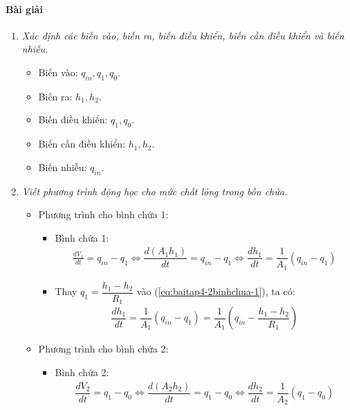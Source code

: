 \paragraph{Bài giải}
    \begin{enumerate}[\it a.]
        \item \textit{Xác định các biến vào, biến ra, biến điều khiển, biến cần điều khiển và biến nhiễu.}
            \begin{itemize}
                \item Biến vào: $q_{in}, q_1, q_0$.
                \item Biến ra: $h_1, h_2$.
                \item Biến điều khiển: $q_1, q_0$.
                \item Biến cần điều khiển: $h_1, h_2$.
                \item Biến nhiễu: $q_{in}$.
            \end{itemize}

        \item \textit{Viết phương trình động học cho mức chất lỏng trong bồn chứa.}
            \begin{itemize}
                \item Phương trình cho bình chứa 1:
                    \begin{itemize}
                        \item Bình chứa 1:
                            \begin{align} \label{eq:baitap4-2binhchua-1}
                                \frac{dV_1}{dt} = q_{in} - q_1 \Longleftrightarrow \dfrac{d\left({A_1 h_1}\right)}{dt} = q_{in} - q_1 \Longleftrightarrow \dfrac{dh_1}{dt} = \dfrac{1}{A_1} \left({q_{in} - q_1}\right)
                            \end{align}

                        \item Thay $q_1 = \dfrac{h_1 - h_2}{R_1}$ vào (\ref{eq:baitap4-2binhchua-1}), ta có:
                            \begin{align} \label{eq:baitap4-2binhchua-2}
                                \dfrac{dh_1}{dt} = \dfrac{1}{A_1} \left({q_{in} - q_1}\right) = \dfrac{1}{A_1} \left({q_{in} - \dfrac{h_1 - h_2}{R_1}}\right)
                            \end{align}
                    \end{itemize}

                \item Phương trình cho bình chứa 2:
                    \begin{itemize}
                        \item Bình chứa 2:
                            \begin{align} \label{eq:baitap4-2binhchua-3}
                                \dfrac{dV_2}{dt} = q_1 - q_0 \Longleftrightarrow \dfrac{d\left({A_2 h_2}\right)}{dt} = q_1 - q_0 \Longleftrightarrow \dfrac{dh_2}{dt} = \dfrac{1}{A_2} \left({q_1 - q_0}\right)
                            \end{align}


\end{itemize}
\end{itemize}
\end{enumerate}
